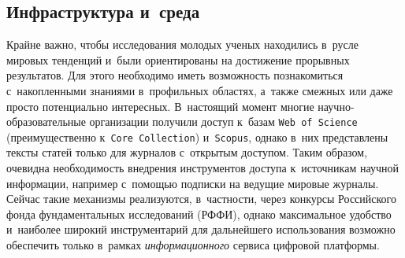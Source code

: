 \begin{multicols}{2}
\section{Инфраструктура и~среда}
\label{Infrastructure}

Крайне важно, чтобы исследования молодых ученых находились в~русле мировых 
тенденций и~были ориентированы на достижение прорывных результатов.
 Для этого необходимо иметь возможность познакомиться с~накопленными 
 знаниями в~профильных областях, а~также смежных или даже просто потенциально 
 интересных. В~настоящий момент многие на\-уч\-но-об\-ра\-зо\-ва\-тель\-ные 
 организации получили доступ к~базам \verb"Web of Science" (преимущественно 
 к~\verb"Core Collection") и~\verb"Scopus", однако в~них представлены тексты 
 статей только для журналов с~открытым доступом. Таким образом, очевидна 
 необходимость внедрения инструментов доступа к~источникам научной информации, 
 например с~помощью подписки на ведущие мировые журналы. Сейчас такие механизмы 
 реализуются, в~частности, через конкурсы Российского фонда фундаментальных 
 исследований (РФФИ), однако максимальное удобство и~наиболее широкий 
 инструментарий для дальнейшего использования возможно обеспечить только 
 в~рамках \textit{информационного} сервиса цифровой платформы.


\end{multicols}
